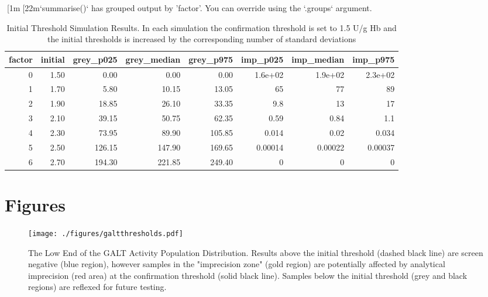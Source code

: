 \documentclass[review]{elsarticle}
\begin{document}
[1m[22m`summarise()` has grouped output by 'factor'. You can override using the `.groups` argument.
\begin{table}[ht]
\centering
\begin{tabular}{rrrrrrrr}
  \hline
factor & initial & grey\_p025 & grey\_median & grey\_p975 & imp\_p025 & imp\_median & imp\_p975 \\ 
  \hline
  0 & 1.50 & 0.00 & 0.00 & 0.00 & 1.6e+02 & 1.9e+02 & 2.3e+02 \\ 
    1 & 1.70 & 5.80 & 10.15 & 13.05 &  65 &  77 &  89 \\ 
    2 & 1.90 & 18.85 & 26.10 & 33.35 & 9.8 &  13 &  17 \\ 
    3 & 2.10 & 39.15 & 50.75 & 62.35 & 0.59 & 0.84 & 1.1 \\ 
    4 & 2.30 & 73.95 & 89.90 & 105.85 & 0.014 & 0.02 & 0.034 \\ 
    5 & 2.50 & 126.15 & 147.90 & 169.65 & 0.00014 & 0.00022 & 0.00037 \\ 
    6 & 2.70 & 194.30 & 221.85 & 249.40 &   0 &   0 &   0 \\ 
   \hline
\end{tabular}
\caption{Initial Threshold Simulation Results. In each simulation the confirmation threshold is set to 1.5 U/g Hb and the initial thresholds is increased by the corresponding number of standard deviations} 
\label{tab:imprecision}
\end{table}

\clearpage

\section*{Figures}
\label{sec:orgebb6f14}

\begin{figure}[htbp]
\centering
\texttt{[image: ./figures/galtthresholds.pdf]}
\caption{\label{fig:org228f36f}The Low End of the GALT Activity Population Distribution. Results above the initial threshold (dashed black line) are screen negative (blue region), however samples in the "imprecision zone" (gold region) are potentially affected by analytical imprecision (red area) at the confirmation threshold (solid black line). Samples below the initial threshold (grey and black regions) are reflexed for future testing.}
\end{figure}

\clearpage
\end{document}
